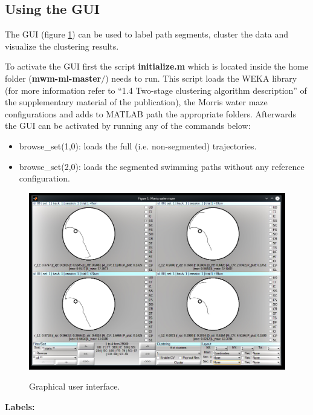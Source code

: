 \documentclass[12pt,titlepage]{article}
\begin{document}
\begin{doublespace}
\subsection{Using the GUI}

The GUI (figure \ref{gui}) can be used to label path segments, cluster the data and visualize the clustering results.

To activate the GUI first the script \textbf{initialize.m} which is located inside the home folder (\textbf{mwm-ml-master$\textbf{/}$}) needs to run. This script loads the WEKA library (for more information refer to ``1.4 Two-stage clustering algorithm description'' of the supplementary material of the publication), the Morris water maze configurations and adds to MATLAB path the appropriate folders. Afterwards the GUI can be activated by running any of the commands below:
\begin{itemize}
	\item browse\_set(1,0): loads the full (i.e. non-segmented) trajectories.
	\item browse\_set(2,0): loads the segmented swimming paths without any reference configuration.
\end{itemize}

\begin{figure}[H]
	\begin{center}
		\includegraphics[width=1\textwidth]{gui.jpg}\\
		\caption [gui]{Graphical user interface.}\label{gui}
	\end{center}
\end{figure}

\noindent\textbf{Labels:}


\end{doublespace}
\end{document}
